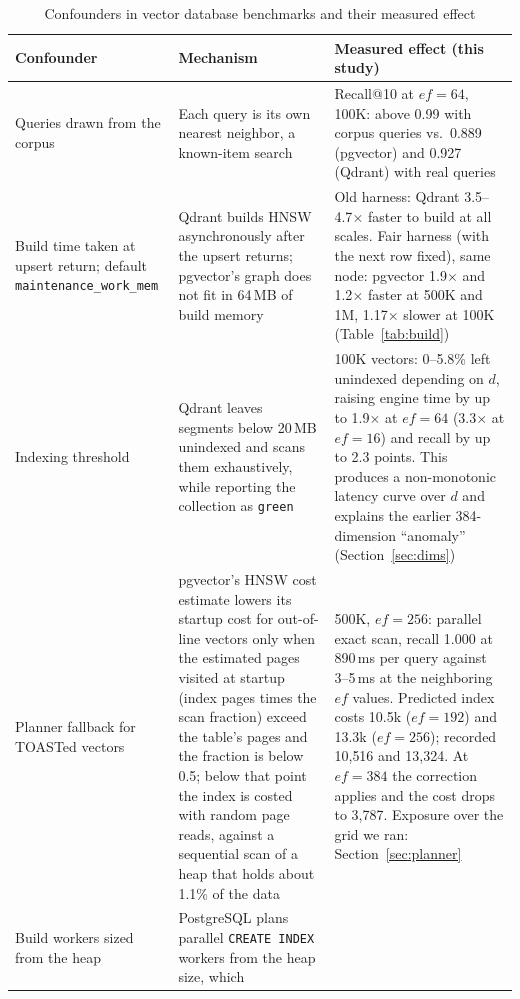 \documentclass[sigconf, nonacm]{acmart}
\begin{document}
\begin{table}[t]
  \caption{Confounders in vector database benchmarks and their measured effect}
  \label{tab:confounders}
  \small
  \begin{tabular}{p{}p{}p{}}
    \toprule
    Confounder & Mechanism & Measured effect (this study) \\
    \midrule
    Queries drawn from the corpus &
      Each query is its own nearest neighbor, a known-item search &
      Recall@10 at $ef=64$, 100K: above 0.99 with corpus queries vs.\ 0.889
      (pgvector) and 0.927 (Qdrant) with real queries \\
    Build time taken at upsert return; default \texttt{maintenance\_work\_mem} &
      Qdrant builds HNSW asynchronously after the upsert returns; pgvector's graph does
      not fit in 64\,MB of build memory &
      Old harness: Qdrant 3.5--4.7$\times$ faster to build at all scales. Fair harness
      (with the next row fixed), same node: pgvector 1.9$\times$ and 1.2$\times$ faster at
      500K and 1M, 1.17$\times$ slower at 100K (Table~\ref{tab:build}) \\
    Indexing threshold &
      Qdrant leaves segments below 20\,MB unindexed and scans them exhaustively, while
      reporting the collection as \texttt{green} &
      100K vectors: 0--5.8\% left unindexed depending on $d$, raising engine time by up to
      1.9$\times$ at $ef=64$ (3.3$\times$ at $ef=16$) and recall by up to
      2.3 points. This produces a non-monotonic latency curve over $d$ and explains the
      earlier 384-dimension ``anomaly'' (Section~\ref{sec:dims}) \\
    Planner fallback for TOASTed vectors &
      pgvector's HNSW cost estimate lowers its startup cost for out-of-line vectors only when
      the estimated pages visited at startup (index pages times the scan fraction) exceed the
      table's pages and the fraction is below 0.5; below that point the index is costed
      with random page reads, against a sequential scan of a heap that holds about 1.1\%
      of the data &
      500K, $ef=256$: parallel exact scan, recall 1.000 at 890\,ms per query
      against 3--5\,ms at the neighboring $ef$ values. Predicted index costs 10.5k
      ($ef=192$) and 13.3k ($ef=256$); recorded 10{,}516 and 13{,}324. At $ef=384$ the
      correction applies and the cost drops to 3{,}787. Exposure over the grid we ran:
      Section~\ref{sec:planner} \\
    Build workers sized from the heap &
      PostgreSQL plans parallel \texttt{CREATE INDEX} workers from the heap size, which

\end{tabular}
\end{table}
\end{document}

